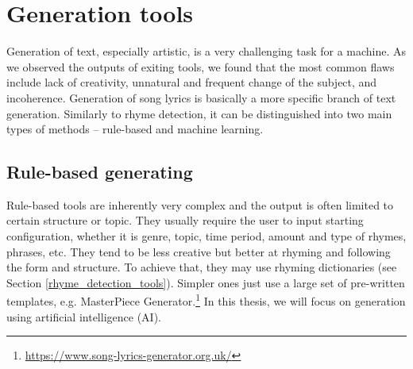 \section{Generation tools}\label{generation_tools}

Generation of text, especially artistic, is a very challenging task for a machine. As we observed the outputs of exiting tools, we found that the most common flaws include lack of creativity, unnatural and frequent change of the subject, and incoherence. Generation of song lyrics is basically a more specific branch of text generation. Similarly to rhyme detection, it can be distinguished into two main types of methods -- rule-based and machine learning.


\subsection{Rule-based generating}
Rule-based tools are inherently very complex and the output is often limited to certain structure or topic. They usually require the user to input starting configuration, whether it is genre, topic, time period, amount and type of rhymes, phrases, etc. They tend to be less creative but better at rhyming and following the form and structure. To achieve that, they may use rhyming dictionaries (see Section \ref{rhyme_detection_tools}). Simpler ones just use a large set of pre-written templates, e.g. MasterPiece Generator.\footnote{\url{https://www.song-lyrics-generator.org.uk/}} In this thesis, we will focus on generation using artificial intelligence (AI).

